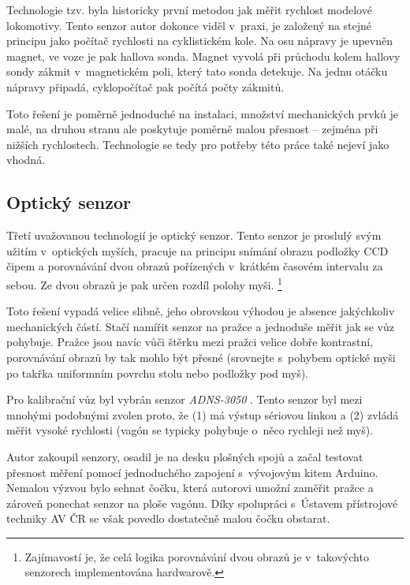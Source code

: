 Technologie tzv.  byla historicky první metodou jak měřit
rychlost modelové lokomotivy. Tento senzor autor dokonce viděl v~praxi, je
založený na stejné principu jako počítač rychlosti na cyklistickém kole.  Na
osu nápravy je upevněn magnet, ve voze je pak hallova sonda. Magnet vyvolá při
průchodu kolem hallovy sondy zákmit v~magnetickém poli, který tato sonda
detekuje. Na jednu otáčku nápravy připadá, cyklopočítač pak počítá počty zákmitů.

Toto řešení je poměrně jednoduché na instalaci, množství mechanických prvků je
malé, na druhou stranu ale poskytuje poměrně malou přesnost -- zejména při
nižších rychlostech. Technologie  se tedy pro potřeby této
práce také nejeví jako vhodná.

\subsection{Optický senzor}
\label{subsec:wsm-senzor-opto}

Třetí uvažovanou technologií je optický senzor. Tento senzor je proslulý svým
užitím v~optických myších, pracuje na principu snímání obrazu podložky CCD
čipem a porovnávání dvou obrazů pořízených v~krátkém časovém intervalu za
sebou. Ze dvou obrazů je pak určen rozdíl polohy myši. \footnote{Zajímavostí
je, že celá logika porovnávání dvou obrazů je v~takovýchto senzorech
implementována hardwarově.}

Toto řešení vypadá velice slibně, jeho obrovskou výhodou je absence jakýchkoliv
mechanických částí. Stačí namířit senzor na pražce a jednoduše měřit jak se vůz
pohybuje. Pražce jsou navíc vůči štěrku mezi pražci velice dobře kontrastní,
porovnávání obrazů by tak mohlo být přesné (srovnejte s~pohybem optické
myši po takřka uniformním povrchu stolu nebo podložky pod myš).

Pro kalibrační vůz byl vybrán senzor \textit{ADNS-3050} \cite{adns-3050}.
Tento senzor byl mezi mnohými podobnými zvolen proto, že (1) má výstup sériovou
linkou a (2) zvládá měřit vysoké rychlosti (vagón se typicky pohybuje o~něco
rychleji než myš).

Autor zakoupil senzory, osadil je na desku plošných spojů a začal testovat
přesnost měření pomocí jednoduchého zapojení s~vývojovým kitem Arduino. Nemalou
výzvou bylo sehnat čočku, která autorovi umožní zaměřit pražce a zároveň
ponechat senzor na ploše vagónu. Díky spolupráci s~Ústavem přístrojové techniky
AV ČR se však povedlo dostatečně malou čočku obstarat.

